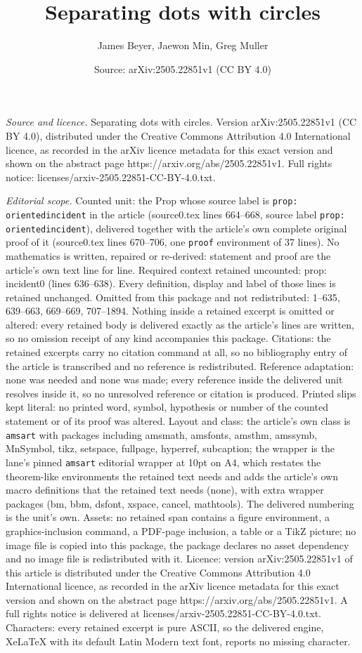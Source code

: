 \documentclass[10pt,a4paper]{amsart}
\title[Separating dots with circles]{Separating dots with circles}
\author{James Beyer, Jaewon Min, Greg Muller}
\date{Source: arXiv:2505.22851v1 (CC BY 4.0)}
\begin{document}
\maketitle

\noindent\emph{Source and licence.} Separating dots with circles. Version arXiv:2505.22851v1 (CC BY 4.0), distributed under the Creative Commons Attribution 4.0 International licence, as recorded in the arXiv licence metadata for this exact version and shown on the abstract page https://arxiv.org/abs/2505.22851v1. Full rights notice: licenses/arxiv-2505.22851-CC-BY-4.0.txt.\par\smallskip

\noindent\textit{Editorial scope.} Counted unit: the Prop whose source label is \texttt{prop: orientedincident} in the article (source0.tex lines 664--668, source label \texttt{prop: orientedincident}), delivered together with the article's own complete original proof of it (source0.tex lines 670--706, one \texttt{proof} environment of 37 lines). No mathematics is written, repaired or re-derived: statement and proof are the article's own text line for line. Required context retained uncounted: prop: incident0 (lines 636--638). Every definition, display and label of those lines is retained unchanged. Omitted from this package and not redistributed: 1--635, 639--663, 669--669, 707--1894. Nothing inside a retained excerpt is omitted or altered: every retained body is delivered exactly as the article's lines are written, so no omission receipt of any kind accompanies this package. Citations: the retained excerpts carry no citation command at all, so no bibliography entry of the article is transcribed and no reference is redistributed. Reference adaptation: none was needed and none was made; every reference inside the delivered unit resolves inside it, so no unresolved reference or citation is produced. Printed slips kept literal: no printed word, symbol, hypothesis or number of the counted statement or of its proof was altered. Layout and class: the article's own class is \texttt{amsart} with packages including amsmath, amsfonts, amsthm, amssymb, MnSymbol, tikz, setspace, fullpage, hyperref, subcaption; the wrapper is the lane's pinned \texttt{amsart} editorial wrapper at 10pt on A4, which restates the theorem-like environments the retained text needs and adds the article's own macro definitions that the retained text needs (none), with extra wrapper packages (bm, bbm, dsfont, xspace, cancel, mathtools). The delivered numbering is the unit's own. Assets: no retained span contains a figure environment, a graphics-inclusion command, a PDF-page inclusion, a table or a TikZ picture; no image file is copied into this package, the package declares no asset dependency and no image file is redistributed with it. Licence: version arXiv:2505.22851v1 of this article is distributed under the Creative Commons Attribution 4.0 International licence, as recorded in the arXiv licence metadata for this exact version and shown on the abstract page https://arxiv.org/abs/2505.22851v1. A full rights notice is delivered at licenses/arxiv-2505.22851-CC-BY-4.0.txt. Characters: every retained excerpt is pure ASCII, so the delivered engine, XeLaTeX with its default Latin Modern text font, reports no missing character.
\end{document}

